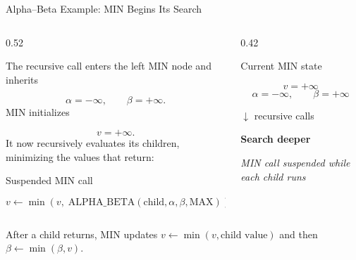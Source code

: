 \documentclass[aspectratio=169,10pt]{beamer}
\begin{document}



\begin{frame}[shrink=18]{Alpha--Beta Example: MIN Begins Its Search}

  \begin{columns}[T,onlytextwidth]

    \begin{column}{0.52\textwidth}

      The recursive call enters the left MIN node and inherits

      \[
        \alpha=-\infty,\qquad
        \beta=+\infty.
      \]
      MIN initializes

      \[
        v=+\infty.
      \]
      It now recursively evaluates its children, minimizing the values that return:

      \begin{block}{Suspended MIN call}

        \[
          v \leftarrow
          \min\left(
            v,\;
            \text{ALPHA\_BETA}(\text{child},\alpha,\beta,\text{MAX})
          \right)
        \]
      \end{block}

    \end{column}

    \begin{column}{0.42\textwidth}

      \begin{block}{Current MIN state}

        \[
          v=+\infty
        \]
        \[
          \alpha=-\infty,\qquad \beta=+\infty
        \]
      \end{block}

      \begin{center}

        $\downarrow$ recursive calls

        \vspace{0.08in}

        \textbf{Search deeper}

        \vspace{0.08in}

        \textit{MIN call suspended while each child runs}

      \end{center}

    \end{column}

  \end{columns}

  \begin{keyidea}

    After a child returns, MIN updates
    $v \leftarrow \min(v,\text{child value})$ and then
    $\beta \leftarrow \min(\beta,v)$.

  \end{keyidea}

\end{frame}
\end{document}
